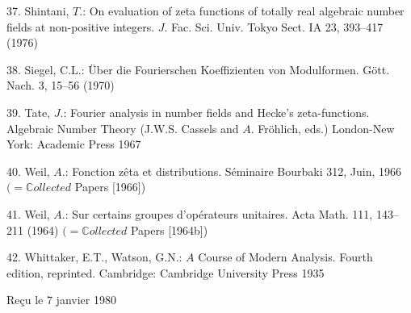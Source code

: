\documentclass[11pt]{article}
\begin{document}
\par
37. Shintani, \(T\).: On evaluation of zeta functions of totally real algebraic number fields at non-positive integers. \(J\). Fac. Sci. Univ. Tokyo Sect. IA 23, 393--417 (1976)\par
\par
38. Siegel, C.L.: Über die Fourierschen Koeffizienten von Modulformen. Gött. Nach. 3, 15--56 (1970)\par
\par
39. Tate, \(J\).: Fourier analysis in number fields and Hecke’s zeta-functions. Algebraic Number Theory (J.W.S. Cassels and \(A\). Fröhlich, eds.) London-New York: Academic Press 1967\par
\par
40. Weil, \(A\).: Fonction zêta et distributions. Séminaire Bourbaki 312, Juin, 1966 \((=\mathbb{C}ollected\) Papers [1966])\par
\par
41. Weil, \(A\).: Sur certains groupes d’opérateurs unitaires. Acta Math. 111, 143--211 (1964) \((=\mathbb{C}ollected\) Papers [1964b])\par
\par
42. Whittaker, E.T., Watson, G.N.: \(A\) Course of Modern Analysis. Fourth edition, reprinted. Cambridge: Cambridge University Press 1935\par
\par
Reçu le 7 janvier 1980\par
\endgroup
\end{document}
